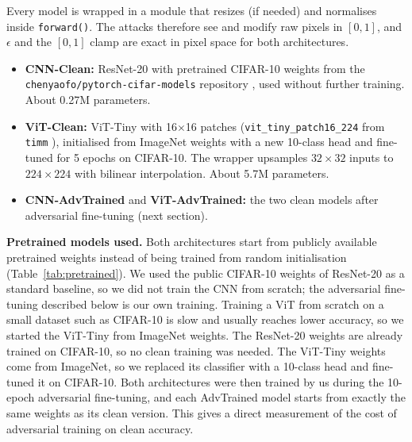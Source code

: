 \documentclass[twoside,a4paper,11pt]{article}
\begin{document}
Every model is wrapped in a module that resizes (if needed) and
normalises inside \texttt{forward()}. The attacks therefore see and
modify raw pixels in $[0,1]$, and $\epsilon$ and the $[0,1]$ clamp are
exact in pixel space for both architectures.

\begin{itemize}
\item \textbf{CNN-Clean:} ResNet-20 \cite{He:16} with pretrained CIFAR-10
weights from the \texttt{chenyaofo/pytorch-cifar-models} repository
\cite{Chenyaofo}, used without further training. About 0.27M parameters.
\item \textbf{ViT-Clean:} ViT-Tiny with 16$\times$16 patches
(\texttt{vit\_tiny\_patch16\_224} from \texttt{timm} \cite{Wightman:19}),
initialised from ImageNet weights with a new 10-class head and fine-tuned
for 5 epochs on CIFAR-10. The wrapper upsamples $32 \times 32$ inputs to
$224 \times 224$ with bilinear interpolation. About 5.7M parameters.
\item \textbf{CNN-AdvTrained} and \textbf{ViT-AdvTrained:} the two clean
models after adversarial fine-tuning (next section).
\end{itemize}

\textbf{Pretrained models used.} Both architectures start from publicly
available pretrained weights instead of being trained from random
initialisation (Table~\ref{tab:pretrained}). We used the public CIFAR-10
weights of ResNet-20 as a standard baseline, so we did not train the CNN
from scratch; the adversarial fine-tuning described below is our own
training. Training a ViT from scratch on a small dataset such as CIFAR-10
is slow and usually reaches lower accuracy, so we started the ViT-Tiny
from ImageNet weights. The ResNet-20 weights are already trained on
CIFAR-10, so no clean training was needed. The ViT-Tiny weights come from
ImageNet, so we replaced its classifier with a 10-class head and
fine-tuned it on CIFAR-10. Both architectures were then trained by us
during the 10-epoch adversarial fine-tuning, and each AdvTrained model
starts from exactly the same weights as its clean version. This gives a
direct measurement of the cost of adversarial training on clean accuracy.
\end{document}

